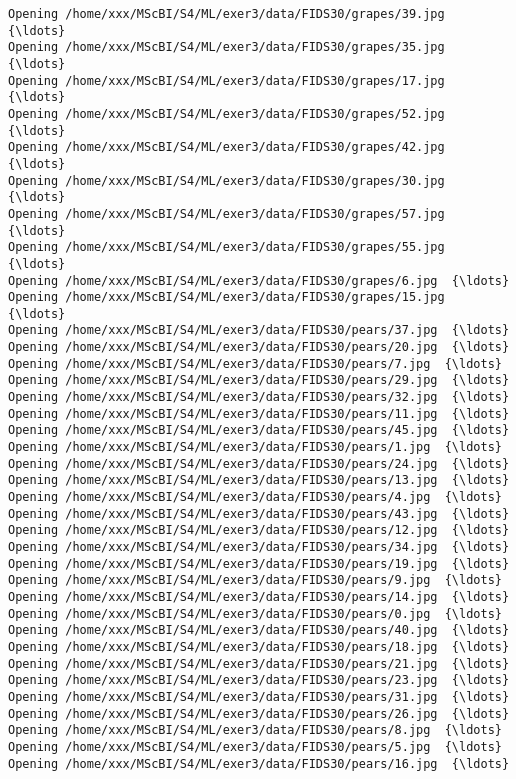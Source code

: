 \documentclass[11pt]{article}
\begin{document}
\begin{Verbatim}[commandchars=\\\{\}]
Opening /home/xxx/MScBI/S4/ML/exer3/data/FIDS30/grapes/39.jpg  {\ldots}
Opening /home/xxx/MScBI/S4/ML/exer3/data/FIDS30/grapes/35.jpg  {\ldots}
Opening /home/xxx/MScBI/S4/ML/exer3/data/FIDS30/grapes/17.jpg  {\ldots}
Opening /home/xxx/MScBI/S4/ML/exer3/data/FIDS30/grapes/52.jpg  {\ldots}
Opening /home/xxx/MScBI/S4/ML/exer3/data/FIDS30/grapes/42.jpg  {\ldots}
Opening /home/xxx/MScBI/S4/ML/exer3/data/FIDS30/grapes/30.jpg  {\ldots}
Opening /home/xxx/MScBI/S4/ML/exer3/data/FIDS30/grapes/57.jpg  {\ldots}
Opening /home/xxx/MScBI/S4/ML/exer3/data/FIDS30/grapes/55.jpg  {\ldots}
Opening /home/xxx/MScBI/S4/ML/exer3/data/FIDS30/grapes/6.jpg  {\ldots}
Opening /home/xxx/MScBI/S4/ML/exer3/data/FIDS30/grapes/15.jpg  {\ldots}
Opening /home/xxx/MScBI/S4/ML/exer3/data/FIDS30/pears/37.jpg  {\ldots}
Opening /home/xxx/MScBI/S4/ML/exer3/data/FIDS30/pears/20.jpg  {\ldots}
Opening /home/xxx/MScBI/S4/ML/exer3/data/FIDS30/pears/7.jpg  {\ldots}
Opening /home/xxx/MScBI/S4/ML/exer3/data/FIDS30/pears/29.jpg  {\ldots}
Opening /home/xxx/MScBI/S4/ML/exer3/data/FIDS30/pears/32.jpg  {\ldots}
Opening /home/xxx/MScBI/S4/ML/exer3/data/FIDS30/pears/11.jpg  {\ldots}
Opening /home/xxx/MScBI/S4/ML/exer3/data/FIDS30/pears/45.jpg  {\ldots}
Opening /home/xxx/MScBI/S4/ML/exer3/data/FIDS30/pears/1.jpg  {\ldots}
Opening /home/xxx/MScBI/S4/ML/exer3/data/FIDS30/pears/24.jpg  {\ldots}
Opening /home/xxx/MScBI/S4/ML/exer3/data/FIDS30/pears/13.jpg  {\ldots}
Opening /home/xxx/MScBI/S4/ML/exer3/data/FIDS30/pears/4.jpg  {\ldots}
Opening /home/xxx/MScBI/S4/ML/exer3/data/FIDS30/pears/43.jpg  {\ldots}
Opening /home/xxx/MScBI/S4/ML/exer3/data/FIDS30/pears/12.jpg  {\ldots}
Opening /home/xxx/MScBI/S4/ML/exer3/data/FIDS30/pears/34.jpg  {\ldots}
Opening /home/xxx/MScBI/S4/ML/exer3/data/FIDS30/pears/19.jpg  {\ldots}
Opening /home/xxx/MScBI/S4/ML/exer3/data/FIDS30/pears/9.jpg  {\ldots}
Opening /home/xxx/MScBI/S4/ML/exer3/data/FIDS30/pears/14.jpg  {\ldots}
Opening /home/xxx/MScBI/S4/ML/exer3/data/FIDS30/pears/0.jpg  {\ldots}
Opening /home/xxx/MScBI/S4/ML/exer3/data/FIDS30/pears/40.jpg  {\ldots}
Opening /home/xxx/MScBI/S4/ML/exer3/data/FIDS30/pears/18.jpg  {\ldots}
Opening /home/xxx/MScBI/S4/ML/exer3/data/FIDS30/pears/21.jpg  {\ldots}
Opening /home/xxx/MScBI/S4/ML/exer3/data/FIDS30/pears/23.jpg  {\ldots}
Opening /home/xxx/MScBI/S4/ML/exer3/data/FIDS30/pears/31.jpg  {\ldots}
Opening /home/xxx/MScBI/S4/ML/exer3/data/FIDS30/pears/26.jpg  {\ldots}
Opening /home/xxx/MScBI/S4/ML/exer3/data/FIDS30/pears/8.jpg  {\ldots}
Opening /home/xxx/MScBI/S4/ML/exer3/data/FIDS30/pears/5.jpg  {\ldots}
Opening /home/xxx/MScBI/S4/ML/exer3/data/FIDS30/pears/16.jpg  {\ldots}

\end{Verbatim}
\end{document}
